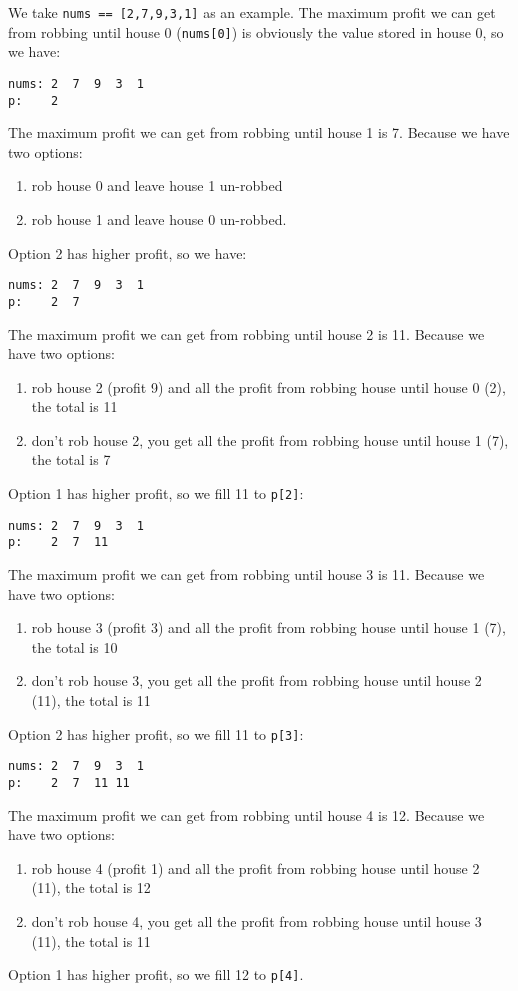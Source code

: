 \documentclass[11pt]{article}
\begin{document}
We take \texttt{nums == [2,7,9,3,1]} as an example. The maximum profit we can get from robbing until house 0 (\texttt{nums[0]}) is obviously the value stored in house 0, so we have:
\begin{Verbatim}[frame=single]
nums: 2  7  9  3  1
p:    2
\end{Verbatim}
The maximum profit we can get from robbing until house 1 is 7. Because we have two options:
\begin{enumerate}
\item rob house 0 and leave house 1 un-robbed
\item rob house 1 and leave house 0 un-robbed.
\end{enumerate}
Option 2 has higher profit, so we have:
\begin{Verbatim}[frame=single]
nums: 2  7  9  3  1
p:    2  7
\end{Verbatim}
The maximum profit we can get from robbing until house 2 is 11. Because we have two options:
\begin{enumerate}
\item rob house 2 (profit 9) and all the profit from robbing house until house 0 (2), the total is 11
\item don't rob house 2, you get all the profit from robbing house until house 1 (7), the total is 7
\end{enumerate}
Option 1 has higher profit, so we fill 11 to \texttt{p[2]}:
\begin{Verbatim}[frame=single]
nums: 2  7  9  3  1
p:    2  7  11
\end{Verbatim}
The maximum profit we can get from robbing until house 3 is 11. Because we have two options:
\begin{enumerate}
\item rob house 3 (profit 3) and all the profit from robbing house until house 1 (7), the total is 10
\item don't rob house 3, you get all the profit from robbing house until house 2 (11), the total is 11
\end{enumerate}
Option 2 has higher profit, so we fill 11 to \texttt{p[3]}:
\begin{Verbatim}[frame=single]
nums: 2  7  9  3  1
p:    2  7  11 11
\end{Verbatim}
The maximum profit we can get from robbing until house 4 is 12. Because we have two options:
\begin{enumerate}
\item rob house 4 (profit 1) and all the profit from robbing house until house 2 (11), the total is 12
\item don't rob house 4, you get all the profit from robbing house until house 3 (11), the total is 11
\end{enumerate}
Option 1 has higher profit, so we fill 12 to \texttt{p[4]}.
\end{document}
